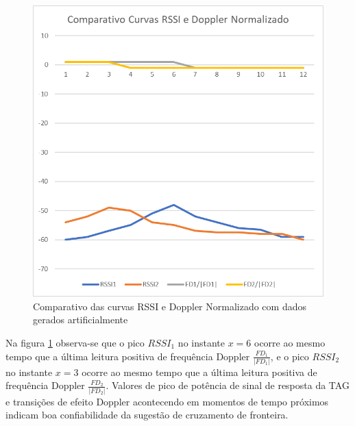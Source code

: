    \begin{figure}[h]
    \centering
    \includegraphics[width=0.8\linewidth]{figs/Metodologia/image009.png}
    \caption{Comparativo das curvas RSSI e Doppler Normalizado com dados gerados artificialmente}
    \label{fig:RSSI_Doppler_norm_MET}
\end{figure}

Na figura \ref{fig:RSSI_Doppler_norm_MET} observa-se que o pico $RSSI_1$ no instante $x=6$ ocorre ao mesmo tempo que a última leitura positiva de frequência Doppler $\frac{FD_1}{|FD_1|}$, e o pico $RSSI_2$ no instante $x=3$ ocorre ao mesmo tempo que a última leitura positiva de frequência Doppler $\frac{FD_2}{|FD_2|}$. Valores de pico de potência de sinal de resposta da TAG e transições de efeito Doppler acontecendo em momentos de tempo próximos indicam boa confiabilidade da sugestão de cruzamento de fronteira.